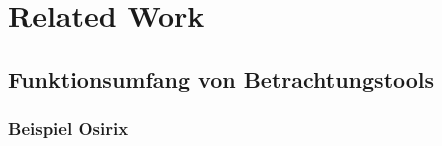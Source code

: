 \section{Related Work}
\label{sec:relatedWork}

\subsection{Funktionsumfang von Betrachtungstools}
\subsubsection{Beispiel Osirix}
\label{sec:Motivation}

